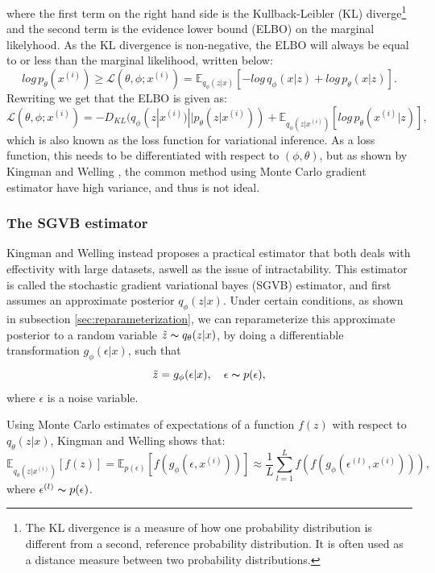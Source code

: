 where the first term on the right hand side is the Kullback-Leibler (KL) diverge\footnote{The KL divergence is a measure of how one 
probability distribution is different from a second, reference probability distribution. It is often used as a distance measure 
between two probability distributions.} and the second term is the evidence lower bound (ELBO) on the marginal likelyhood. As the KL divergence
is non-negative, the ELBO will always be equal to or less than the marginal likelihood, written below:
\begin{equation}
    log\, p_{\theta}(x^{(i)}) \geq \mathcal{L}(\theta, \phi;x^{(i)}) = \mathbb{E}_{q_{\phi}(z|x)}[-log\, q_{\phi}(x|z)+log\, p_{\theta}(x|z)].
\end{equation}
Rewriting we get that the ELBO is given as:
\begin{equation}
    \mathcal{L}(\theta, \phi;x^{(i)}) =  - D_{KL}(q_{\phi}(z|x^{(i)})||p_{\theta}(z|x^{(i)})) + \mathbb{E}_{q_{\phi}(z|x^{(i)})}[log\, p_{\theta}(x^{(i)}|z)],
\end{equation}
which is also known as the loss function for variational inference. As a loss function, this needs to be differentiated with respect to 
$(\phi, \theta)$, but as shown by Kingman and Welling \cite{VAE}, the common method using Monte Carlo gradient estimator have high variance,
and thus is not ideal. 

\subsubsection*{The SGVB estimator}
Kingman and Welling \cite{VAE} instead proposes a practical estimator that both deals with effectivity with large datasets, aswell as the 
issue of intractability. This estimator is called the stochastic gradient variational bayes (SGVB) estimator, and first assumes an approximate 
posterior $q_{\phi}(z|x)$. Under certain conditions, as shown in subsection \ref{sec:reparameterization}, we can reparameterize this approximate
posterior to a random variable $\tilde{z} \thicksim q_{\theta}(z|x)$, by doing a differentiable transformation $g_{\phi}(\epsilon|x)$, such that 
\begin{equation*}
    \tilde{z} = g_{\phi}(\epsilon|x), \quad \epsilon \thicksim p(\epsilon),
\end{equation*}
where $\epsilon$ is a noise variable.\par 
Using Monte Carlo estimates of expectations of a function $f(z)$ with respect to $q_{\theta}(z|x)$, Kingman and Welling \cite{VAE} shows that:
\begin{equation}
    \mathbb{E}_{q_{\theta}(z|x^{(i)})}[f(z)] = \mathbb{E}_{p(\epsilon)}[f(g_{\phi}(\epsilon, x^{(i)}))] \approx \frac{1}{L}\sum_{l=1}^{L}f(f(g_{\phi}(\epsilon^{(l)}, x^{(i)}))),
\end{equation}
where $\epsilon^{(l)} \thicksim p(\epsilon)$.   



